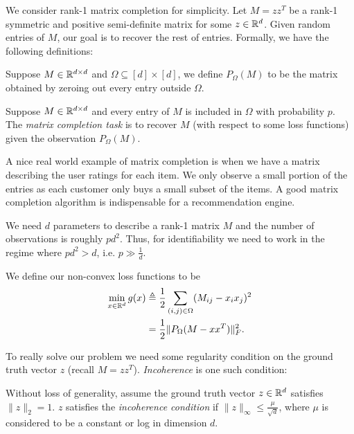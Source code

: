 We consider rank-1 matrix completion for simplicity. Let $M = zz^T$ be a rank-1 symmetric and positive semi-definite matrix for some $z\in \mathbb R^d$. Given random entries of $M$, our goal is to recover the rest of entries. Formally, we have the following definitions:

\begin{definition}
Suppose $M\in \mathbb R^{d\times d}$ and $\Omega \subseteq [d] \times [d]$, we define $P_{\Omega}(M)$ to be the matrix obtained by zeroing out every entry outside $\Omega$. 
\end{definition}

\begin{definition}
Suppose $M\in \mathbb R^{d\times d}$ and every entry of $M$ is included in $\Omega$ with probability $p$. The \textit{matrix completion task} is to recover $M$ (with respect to some loss functions) given the observation $P_{\Omega}(M)$.
\end{definition}

A nice real world example of matrix completion is when we have a matrix describing the user ratings for each item. We only observe a small portion of the entries as each customer only buys a small subset of the items. A good matrix completion algorithm is indispensable for a recommendation engine. 

\begin{remark}
We need $d$ parameters to describe a rank-1 matrix $M$ and the number of observations is roughly $pd^2$. Thus, for identifiability we need to work in the regime where $pd^2 > d$, i.e. $p \gg \frac{1}{d}$. 
\end{remark}

We define our non-convex loss functions to be 
\begin{align}
    \min_{x \in \mathbb R^d}g(x) & \triangleq \frac{1}{2}\sum_{(i,j)\in \Omega}(M_{ij}-x_ix_j)^2 \\
     & = \frac{1}{2}\|P_{\Omega}(M-xx^T)\|_F^2.
\end{align}

To really solve our problem we need some regularity condition on the ground truth vector $z$ (recall $M = zz^T$). \textit{Incoherence} is one such condition:
\begin{definition}[Incoherence]
Without loss of generality, assume the ground truth vector $z\in\mathbb R^d$ satisfies $\|z\|_2 = 1$. $z$ satisfies the \textit{incoherence condition} if $\|z\|_{\infty} \leq \frac{\mu}{\sqrt{d}}$, where $\mu$ is considered to be a constant or log in dimension $d$. 
\end{definition}

